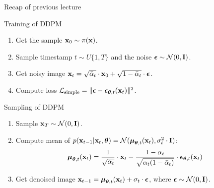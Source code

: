 

\usepackage{tikz}

\usetikzlibrary{arrows,shapes,positioning,shadows,trees}

\begin{frame}
\titlepage
\end{frame}
\begin{frame}{Recap of previous lecture}
	\begin{block}{Training of DDPM}
		\begin{enumerate}
			\item Get the sample $\mathbf{x}_0 \sim \pi(\mathbf{x})$.
			\item Sample timestamp $t \sim U\{1, T\}$ and the noise $\boldsymbol{\epsilon} \sim \mathcal{N}(0, \mathbf{I})$.
			\item Get noisy image $\mathbf{x}_t = \sqrt{\bar{\alpha}_t} \cdot \mathbf{x}_0 + \sqrt{1 - \bar{\alpha}_t} \cdot \boldsymbol{\epsilon}$.
			\item Compute loss $ \mathcal{L}_{\text{simple}} = \| \boldsymbol{\epsilon} - \boldsymbol{\epsilon}_{\boldsymbol{\theta}, t}(\mathbf{x}_t) \|^2 $.
		\end{enumerate}
	\end{block}
	\begin{block}{Sampling of DDPM}
		\begin{enumerate}
			\item Sample $\mathbf{x}_T \sim \mathcal{N}(0, \mathbf{I})$.
			\item Compute mean of $p(\mathbf{x}_{t-1} | \mathbf{x}_t, \boldsymbol{\theta}) = \mathcal{N}(\boldsymbol{\mu}_{\boldsymbol{\theta}, t}(\mathbf{x}_t), \sigma_t^2 \cdot \mathbf{I})$:
			\[
				\boldsymbol{\mu}_{\boldsymbol{\theta}, t}(\mathbf{x}_t) = \frac{1}{\sqrt{\alpha_t}} \cdot \mathbf{x}_t - \frac{1 - \alpha_t}{\sqrt{\alpha_t (1 - \bar{\alpha}_t)}} \cdot \boldsymbol{\epsilon}_{\boldsymbol{\theta}, t}(\mathbf{x}_t)
			\]
			\vspace{-0.3cm}
			\item Get denoised image $\mathbf{x}_{t - 1} = \boldsymbol{\mu}_{\boldsymbol{\theta}, t}(\mathbf{x}_t) +  \sigma_t \cdot \boldsymbol{\epsilon}$, where $\boldsymbol{\epsilon} \sim \mathcal{N}(0, \mathbf{I})$.
		\end{enumerate}
	\end{block}
\end{frame}
